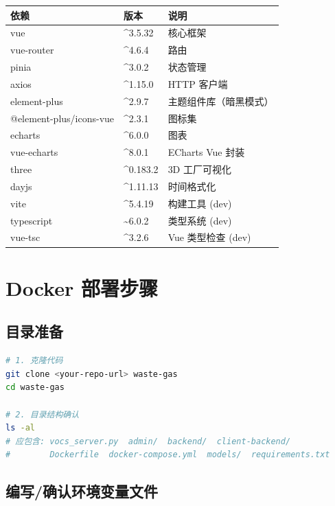 \documentclass[UTF8,a4paper,11pt]{ctexart}
\begin{document}
\begin{longtable}{L{4.2cm} L{2.0cm} L{6.8cm}}
\toprule
\textbf{依赖} & \textbf{版本} & \textbf{说明} \\
\midrule
\endhead
vue                        & \^{}3.5.32   & 核心框架 \\
vue-router                 & \^{}4.6.4    & 路由 \\
pinia                      & \^{}3.0.2    & 状态管理 \\
axios                      & \^{}1.15.0   & HTTP 客户端 \\
element-plus               & \^{}2.9.7    & 主题组件库（暗黑模式） \\
@element-plus/icons-vue    & \^{}2.3.1    & 图标集 \\
echarts                    & \^{}6.0.0    & 图表 \\
vue-echarts                & \^{}8.0.1    & ECharts Vue 封装 \\
three                      & \^{}0.183.2  & 3D 工厂可视化 \\
dayjs                      & \^{}1.11.13  & 时间格式化 \\
vite                       & \^{}5.4.19   & 构建工具 (dev) \\
typescript                 & \~{}6.0.2    & 类型系统 (dev) \\
vue-tsc                    & \^{}3.2.6    & Vue 类型检查 (dev) \\
\bottomrule
\end{longtable}

\section{Docker 部署步骤}

\subsection{目录准备}

\begin{lstlisting}[language=bash]
# 1. 克隆代码
git clone <your-repo-url> waste-gas
cd waste-gas

# 2. 目录结构确认
ls -al
# 应包含: vocs_server.py  admin/  backend/  client-backend/
#        Dockerfile  docker-compose.yml  models/  requirements.txt
\end{lstlisting}

\subsection{编写/确认环境变量文件}
\end{document}
